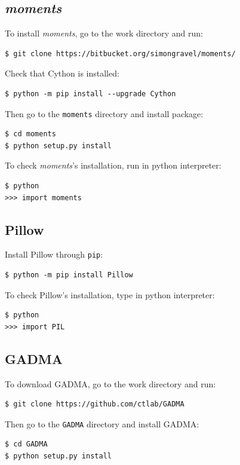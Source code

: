\documentclass[12pt]{article}
\makeatletter
\newcommand{\moments}{\textit{moments}\xspace}
\newcommand{\py}[1]{\lstinline[language=Python, showstringspaces=False]@#1@}
\makeatother
\begin{document}
\subsection{\moments}

To install \moments, go to the work directory and run:

\begin{lstlisting}
$ git clone https://bitbucket.org/simongravel/moments/
\end{lstlisting}

Check that Cython is installed:
\begin{lstlisting}
$ python -m pip install --upgrade Cython
\end{lstlisting}

Then go to the \py{moments} directory and install package:

\begin{lstlisting}
$ cd moments
$ python setup.py install
\end{lstlisting}

To check \moments's installation, run in python interpreter:

\begin{lstlisting}
$ python
>>> import moments
\end{lstlisting}

\subsection{Pillow}

Install Pillow through \py{pip}:

\begin{lstlisting}
$ python -m pip install Pillow
\end{lstlisting}

To check Pillow's installation, type in python interpreter:

\begin{lstlisting}
$ python
>>> import PIL
\end{lstlisting}

\subsection{GADMA}
To download GADMA, go to the work directory and run:

\begin{lstlisting}
$ git clone https://github.com/ctlab/GADMA
\end{lstlisting}

Then go to the \py{GADMA} directory and install GADMA:
\begin{lstlisting}
$ cd GADMA
$ python setup.py install
\end{lstlisting}
\end{document}
